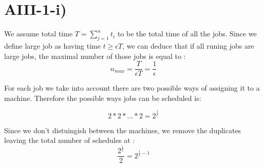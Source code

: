 \section*{AIII-1-i)}
\label{approx-3-1-i}

We assume total time $ T = \sum_{j=1}^{n} t_i $ to be the total time of all the jobs.
Since we define large job as having time  $ t \ge \epsilon T $,
we can deduce that if all runing jobs are large jobs, the maximal number of those jobs is
equal to :
$$ n_{max} = \frac{T}{\epsilon T} = \frac{1}{\epsilon} $$

For each job we take into account there are two possible ways of assigning it to a machine.
Therefore the possible ways jobs can be scheduled is:

$$ 2*2* ... *2 = 2^{\frac{1}{\epsilon}} $$

Since we don't distuingish between the machines, we remove the duplicates leaving the 
total number of schedules at :
$$ \frac{2^\frac{1}{\epsilon}}{2} = 2^{\frac{1}{\epsilon}-1} $$
